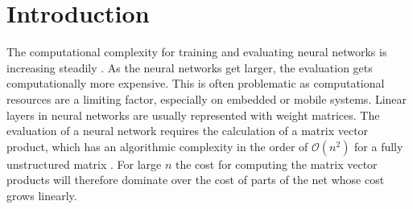 \documentclass[numbers=noenddot,doctype=mastersthesis,BCOR=15mm,biblatex]{ldvbook}%
\newcommand{\bigO}{\mathscr{O}}
\begin{document}
\tableofcontents






\chapter{Introduction} 

The computational complexity for training and evaluating neural networks is increasing steadily \cite{Schwartz_green_2020}.
As the neural networks get larger, the evaluation gets computationally more expensive. This is often problematic as computational resources are a limiting factor, especially on embedded or mobile systems.
Linear layers in neural networks are usually represented with weight matrices.
The evaluation of a neural network requires the calculation of a matrix vector product, which has an algorithmic complexity in the order of $\bigO(n^2)$ for a fully unstructured matrix \cite{hackbusch_hierarchische_2009}.
For large $n$ the cost for computing the matrix vector products will therefore dominate over the cost of parts of the net whose cost grows linearly.
\end{document}
